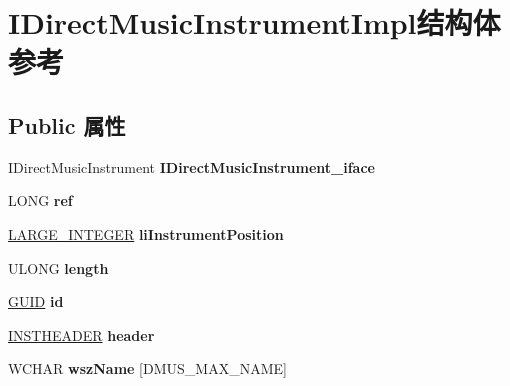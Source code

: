\hypertarget{struct_i_direct_music_instrument_impl}{}\section{I\+Direct\+Music\+Instrument\+Impl结构体 参考}
\label{struct_i_direct_music_instrument_impl}
\subsection*{Public 属性}
\begin{DoxyCompactItemize}
\item 
\mbox{\label{struct_i_direct_music_instrument_impl_a233e2ff626f5140d84ea333c0f2d4dd7}} 
I\+Direct\+Music\+Instrument {\bfseries I\+Direct\+Music\+Instrument\+\_\+iface}
\item 
\mbox{\label{struct_i_direct_music_instrument_impl_a6147309c01f9571966afe9ba4ce8c5c7}} 
L\+O\+NG {\bfseries ref}
\item 
\mbox{\label{struct_i_direct_music_instrument_impl_a38802ee9a98c759cd3f6309264c32385}} 
\hyperlink{union___l_a_r_g_e___i_n_t_e_g_e_r}{L\+A\+R\+G\+E\+\_\+\+I\+N\+T\+E\+G\+ER} {\bfseries li\+Instrument\+Position}
\item 
\mbox{\label{struct_i_direct_music_instrument_impl_a5f99aa332df1cdf8a822e106f2221f71}} 
U\+L\+O\+NG {\bfseries length}
\item 
\mbox{\label{struct_i_direct_music_instrument_impl_a31b0d79980d5093d0a570d1df9dc8ba7}} 
\hyperlink{interface_g_u_i_d}{G\+U\+ID} {\bfseries id}
\item 
\mbox{\label{struct_i_direct_music_instrument_impl_ac1482a46617c77aeb58a780757189e85}} 
\hyperlink{struct___i_n_s_t_h_e_a_d_e_r}{I\+N\+S\+T\+H\+E\+A\+D\+ER} {\bfseries header}
\item 
\mbox{\label{struct_i_direct_music_instrument_impl_a457dbb487a689080e9a8a13b5a034bf5}} 
W\+C\+H\+AR {\bfseries wsz\+Name} \mbox{[}D\+M\+U\+S\+\_\+\+M\+A\+X\+\_\+\+N\+A\+ME\mbox{]}

\end{DoxyCompactItemize}
